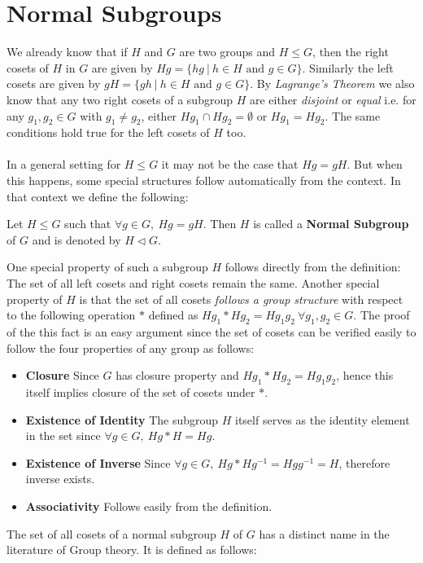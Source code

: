 \section{Normal Subgroups}
We already know that if $H$ and $G$ are two groups and $H\leq G$, then the right cosets of $H$ in $G$ are given by $Hg = \{hg~|~h\in H\text{ and }g\in G\}$. Similarly the left cosets are given by $gH = \{gh~|~h\in H\text{ and }g\in G\}$. By \emph{Lagrange's Theorem} we also know that any two right cosets of a subgroup $H$ are either \emph{disjoint} or \emph{equal} i.e. for any $g_1,g_2\in G$ with $g_1\neq g_2$, either $Hg_1\cap Hg_2 = \emptyset$ or $Hg_1 = Hg_2$. The same conditions hold true for the left cosets of $H$ too.\\\\In a general setting for $H\leq G$ it may not be the case that $Hg = gH$. But when this happens, some special structures follow automatically from the context. In that context we define the following:
\begin{definition}
	Let $H\leq G$ such that $\forall g\in G,~Hg = gH.$ Then $H$ is called a {\bf Normal Subgroup} of $G$ and is denoted by $H\triangleleft G$.
\end{definition}
One special property of such a subgroup $H$ follows directly from the definition: The set of all left cosets and right cosets remain the same. Another special property of $H$ is that the set of all cosets \emph{follows a group structure} with respect to the following operation $*$ defined as $Hg_1*Hg_2 = Hg_1g_2~\forall g_1,g_2\in G$. The proof of the this fact is an easy argument since the set of cosets can be verified easily to follow the four properties of any group as follows:
\begin{itemize}
	\item {\bf Closure} Since $G$ has closure property and $Hg_1*Hg_2 = Hg_1g_2$, hence this itself implies closure of the set of cosets under $*$.
	\item {\bf Existence of Identity} The subgroup $H$ itself serves as the identity element in the set since $\forall g\in G,~Hg*H = Hg$.
	\item {\bf Existence of Inverse} Since $\forall g\in G,~Hg*Hg^{-1} = Hgg^{-1} = H$, therefore inverse exists.
	\item {\bf Associativity} Follows easily from the definition.
\end{itemize}
The set of all cosets of a normal subgroup $H$ of $G$ has a distinct name in the literature of Group theory. It is defined as follows:
